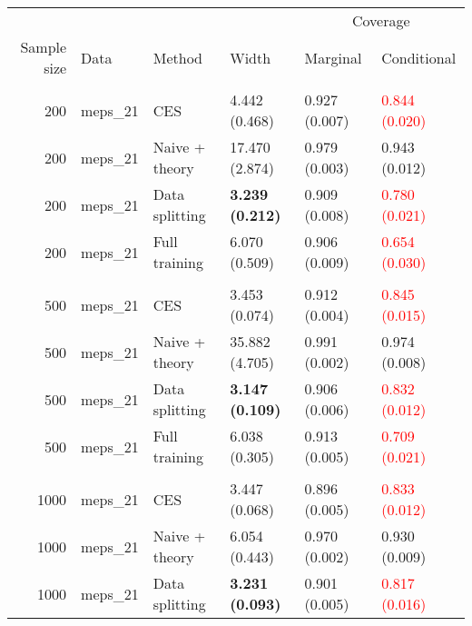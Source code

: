 
\begin{tabular}[t]{rlllll}
\toprule
\multicolumn{4}{c}{ } & \multicolumn{2}{c}{Coverage} \\
\cmidrule(l{3pt}r{3pt}){5-6}
Sample size & Data & Method & Width & Marginal & Conditional\\
\midrule
\addlinespace[0.3em]
\multicolumn{6}{l}{\textbf{200}}\\
\hspace{1em}200 & meps\_21 & CES & 4.442 (0.468) & 0.927 (0.007) & \textcolor{red}{0.844 (0.020)}\\
\hspace{1em}200 & meps\_21 & Naive + theory & 17.470 (2.874) & 0.979 (0.003) & 0.943 (0.012)\\
\hspace{1em}200 & meps\_21 & Data splitting & \textbf{3.239 (0.212)} & 0.909 (0.008) & \textcolor{red}{0.780 (0.021)}\\
\hspace{1em}200 & meps\_21 & Full training & 6.070 (0.509) & 0.906 (0.009) & \textcolor{red}{0.654 (0.030)}\\
\addlinespace[0.3em]
\multicolumn{6}{l}{\textbf{500}}\\
\hspace{1em}500 & meps\_21 & CES & 3.453 (0.074) & 0.912 (0.004) & \textcolor{red}{0.845 (0.015)}\\
\hspace{1em}500 & meps\_21 & Naive + theory & 35.882 (4.705) & 0.991 (0.002) & 0.974 (0.008)\\
\hspace{1em}500 & meps\_21 & Data splitting & \textbf{3.147 (0.109)} & 0.906 (0.006) & \textcolor{red}{0.832 (0.012)}\\
\hspace{1em}500 & meps\_21 & Full training & 6.038 (0.305) & 0.913 (0.005) & \textcolor{red}{0.709 (0.021)}\\
\addlinespace[0.3em]
\multicolumn{6}{l}{\textbf{1000}}\\
\hspace{1em}1000 & meps\_21 & CES & 3.447 (0.068) & 0.896 (0.005) & \textcolor{red}{0.833 (0.012)}\\
\hspace{1em}1000 & meps\_21 & Naive + theory & 6.054 (0.443) & 0.970 (0.002) & 0.930 (0.009)\\
\hspace{1em}1000 & meps\_21 & Data splitting & \textbf{3.231 (0.093)} & 0.901 (0.005) & \textcolor{red}{0.817 (0.016)}\\

\end{tabular}

